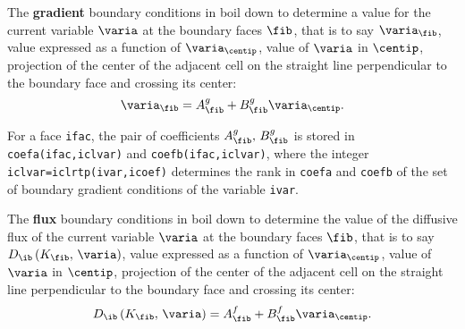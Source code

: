 {{{







The \textbf{gradient} boundary conditions in \CS boil down to determine a value for the
current variable $\varia$ at the boundary faces $\fib$, that is to say $\varia_\fib$,
value expressed as a function of $\varia_{\centip}$, value of $\varia$ in $\centip$,
projection of the center of the adjacent cell on the straight line
perpendicular to the boundary face and crossing its center:
\begin{equation}
\varia_\fib=A_{\fib}^g +B_{\fib}^g \varia_{\centip}.
\end{equation}

For a face \texttt{ifac}, the pair of coefficients $A_{\fib}^g , \, B_{\fib}^g$ is
stored in \texttt{coefa(ifac,iclvar)} and
\texttt{coefb(ifac,iclvar)}, where the integer \texttt{iclvar=iclrtp(ivar,icoef)}
determines the rank in \texttt{coefa} and \texttt{coefb} of the set of boundary
gradient conditions of the variable \texttt{ivar}. 

The \textbf{flux} boundary conditions in \CS boil down to determine the value of the diffusive
flux of the
current variable $\varia$ at the boundary faces $\fib$, that is to say
 $D_{\ib} \left(K_\fib, \, \varia \right)$,
value expressed as a function of $\varia_{\centip}$, value of $\varia$ in $\centip$,
projection of the center of the adjacent cell on the straight line
perpendicular to the boundary face and crossing its center:
\begin{equation}
D_{\ib} \left(K_\fib, \, \varia \right) = A_{\fib}^f +B_{\fib}^f \varia_{\centip}.
\end{equation}

}}}
